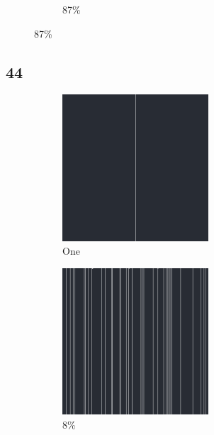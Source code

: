 \documentclass[12pt, fleqn]{report}                             %
\theoremstyle{break}                                            %
\begin{document}
\begin{figure}[ht!]
\begin{subfigure}[b]{0.4\linewidth}
          \caption{87\%}
        \end{subfigure}
      \end{figure}


      \clearpage
      \subsection{44}
      \begin{figure}[ht!]
        \centering
        \begin{subfigure}[b]{0.4\linewidth}
          \includegraphics[width=0.6\textwidth]{Images/44/a.png}
          \caption{One}
        \end{subfigure}
        \begin{subfigure}[b]{0.4\linewidth}
          \includegraphics[width=0.6\textwidth]{Images/44/b.png}
          \caption{8\%}
        \end{subfigure}
        \begin{subfigure}[b]{0.4\linewidth}

\end{subfigure}
\end{figure}
\end{document}
